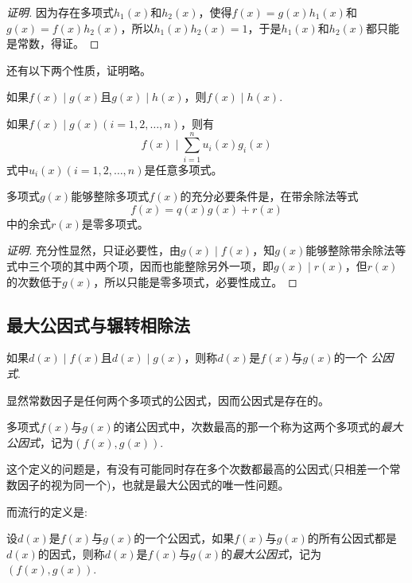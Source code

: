 \begin{proof}[证明]
  因为存在多项式$h_1(x)$和$h_2(x)$，使得$f(x)=g(x)h_1(x)$和$g(x)=f(x)h_2(x)$，所以$h_1(x)h_2(x)=1$，于是$h_1(x)$和$h_2(x)$都只能是常数，得证。
\end{proof}

还有以下两个性质，证明略。
\begin{property}
  如果$f(x) \mid g(x)$且$g(x) \mid h(x)$，则$f(x) \mid h(x)$.
\end{property}

\begin{property}
  如果$f(x) \mid g(x)(i=1,2,\ldots,n)$，则有
  \[ f(x) \mid \sum_{i=1}^n u_i(x)g_i(x) \]
  式中$u_i(x)(i=1,2,\ldots,n)$是任意多项式。
\end{property}

\begin{theorem}
  多项式$g(x)$能够整除多项式$f(x)$的充分必要条件是，在带余除法等式
  \[ f(x)=q(x)g(x)+r(x) \]
  中的余式$r(x)$是零多项式。
\end{theorem}

\begin{proof}[证明]
  充分性显然，只证必要性，由$g(x) \mid f(x)$，知$g(x)$能够整除带余除法等式中三个项的其中两个项，因而也能整除另外一项，即$g(x) \mid r(x)$，但$r(x)$的次数低于$g(x)$，所以只能是零多项式，必要性成立。
\end{proof}

\subsection{最大公因式与辗转相除法}
\label{sec:greatest-common-divisor-and-euclidean-division}

\begin{definition}
  如果$d(x) \mid f(x)$且$d(x) \mid g(x)$，则称$d(x)$是$f(x)$与$g(x)$的一个 \emph{公因式}.
\end{definition}

显然常数因子是任何两个多项式的公因式，因而公因式是存在的。

\begin{definition}
  多项式$f(x)$与$g(x)$的诸公因式中，次数最高的那一个称为这两个多项式的\emph{最大公因式}，记为$(f(x),g(x))$.
\end{definition}

这个定义的问题是，有没有可能同时存在多个次数都最高的公因式(只相差一个常数因子的视为同一个)，也就是最大公因式的唯一性问题。

而流行的定义是:

\begin{definition}
  设$d(x)$是$f(x)$与$g(x)$的一个公因式，如果$f(x)$与$g(x)$的所有公因式都是$d(x)$的因式，则称$d(x)$是$f(x)$与$g(x)$的\emph{最大公因式}，记为$(f(x),g(x))$.
\end{definition}


